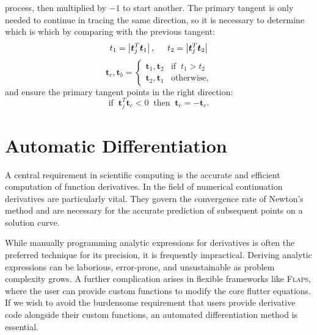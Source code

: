 \documentclass[10pt,openany,twoside]{book}
\numberwithin{equation}{section}   %
\newcommand{\Vector}[1]{\boldsymbol{#1}}
\newcommand{\Flaps}{{\normalfont\scshape Flaps\:}}
\begin{document}
process, then multiplied by $-1$ to start another.
The primary tangent is only needed to continue in tracing the same direction,
so it is necessary to determine which is which by comparing with
the previous tangent:
\begin{equation*}
t_1 = \left| \Vector{t}_j^T \Vector{t}_1 \right|, \hspace{0.2in}
t_2 = \left| \Vector{t}_j^T \Vector{t}_2 \right| \nonumber
\end{equation*}
\begin{equation*}
	\Vector{t}_c, \Vector{t}_b = \begin{cases}
		\Vector{t}_1, \Vector{t}_2 & \text{if} \;\;  t_1 > t_2 \\
		\Vector{t}_2, \Vector{t}_1 & \text{otherwise},
	\end{cases}
\end{equation*}
and ensure the primary tangent points in the right direction:
\begin{equation*}
\text{if} \;\; \Vector{t}_j^T \Vector{t}_c < 0 \;\; \text{then} \;\; \Vector{t}_c = -\Vector{t}_c.
\end{equation*}

\chapter{Automatic Differentiation}\label{chap:AD}
\par
A central requirement in scientific computing is the accurate
and efficient computation of function derivatives. In the field
of numerical continuation derivatives are particularly vital. They govern
the convergence rate of Newton's method and are necessary for the
accurate prediction of subsequent points on a solution curve.

While manually programming analytic expressions for derivatives is
often the preferred technique for its precision, it is frequently
impractical. Deriving analytic expressions can be laborious, error-prone,
and unsustainable as problem complexity grows. A further complication
arises in flexible frameworks like \Flaps, where the user can provide
custom functions to modify the core flutter equations. If we wish to avoid
the burdensome requirement that users provide derivative code alongside
their custom functions, an automated differentiation method is essential.
\end{document}
